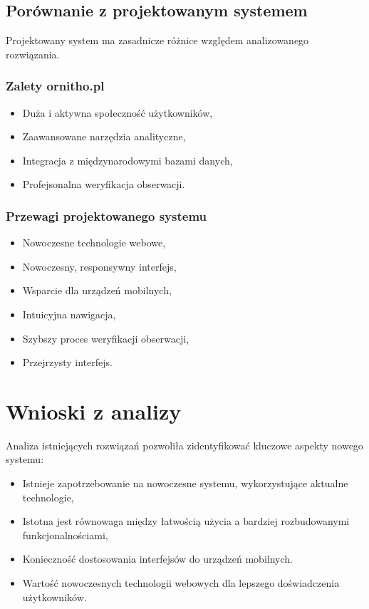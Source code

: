 \subsection{Porównanie z projektowanym systemem}
Projektowany system ma zasadnicze różnice względem analizowanego rozwiązania.

\subsubsection{Zalety ornitho.pl}
\begin{itemize}
	\item Duża i aktywna społeczność użytkowników,
	\item Zaawansowane narzędzia analityczne,
	\item Integracja z międzynarodowymi bazami danych,
	\item Profejsonalna weryfikacja obserwacji.
\end{itemize}

\subsubsection{Przewagi projektowanego systemu}
\begin{itemize}
	\item Nowoczesne technologie webowe,
	\item Nowoczesny, responsywny interfejs,
	\item Wsparcie dla urządzeń mobilnych,
	\item Intuicyjna nawigacja,
	\item Szybszy proces weryfikacji obserwacji,
	\item Przejrzysty interfejs.
\end{itemize}

\section{Wnioski z analizy}
Analiza istniejących rozwiązań pozwoliła zidentyfikować kluczowe aspekty nowego systemu:
\begin{itemize}
	\item Istnieje zapotrzebowanie na nowoczesne systemu, wykorzystujące aktualne technologie,
	\item Istotna jest równowaga między łatwością użycia a bardziej rozbudowanymi funkcjonalnościami,
	\item Konieczność dostosowania interfejsów do urządzeń mobilnych.
	\item Wartość nowoczesnych technologii webowych dla lepszego doświadczenia użytkowników.
\end{itemize}